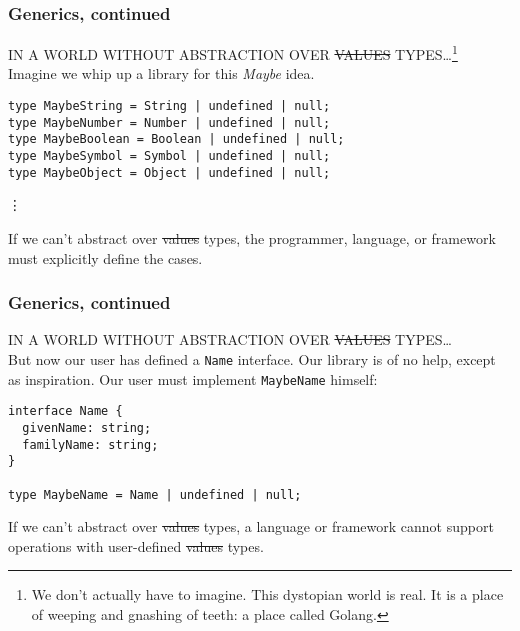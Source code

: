 \documentclass{beamer}
\begin{document}
\begin{frame}[fragile]
  \frametitle{Generics, continued}
  IN A WORLD WITHOUT ABSTRACTION OVER \sout{VALUES} TYPES\ldots\footnote{We
    don't actually have to imagine. This dystopian world is real. It is a
    place of weeping and gnashing of teeth: a place called Golang.} \\

  Imagine we whip up a library for this \textit{Maybe} idea.

  \begin{verbatim}
type MaybeString = String | undefined | null;
type MaybeNumber = Number | undefined | null;
type MaybeBoolean = Boolean | undefined | null;
type MaybeSymbol = Symbol | undefined | null;
type MaybeObject = Object | undefined | null;
  \end{verbatim}
  \vdots

  \vspace{1em}

  \begin{tcolorbox}
    If we can't abstract over \sout{values} types, the programmer, language,
    or framework must explicitly define the cases.
  \end{tcolorbox}

\end{frame}

\begin{frame}[fragile]
  \frametitle{Generics, continued}
  \small
  IN A WORLD WITHOUT ABSTRACTION OVER \sout{VALUES} TYPES\ldots \\

  But now our user has defined a \texttt{Name} interface. Our library is of
  no help, except as inspiration. Our user must implement \texttt{MaybeName}
  himself: \\

  \begin{verbatim}
interface Name {
  givenName: string;
  familyName: string;
}

type MaybeName = Name | undefined | null;
  \end{verbatim}

  \vspace{1em}

  \begin{tcolorbox}
    If we can't abstract over \sout{values} types, a language or framework
    cannot support operations with user-defined \sout{values} types.
  \end{tcolorbox}
\end{frame}
\end{document}
